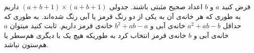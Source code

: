 فرض کنید $a$ و $b$ اعداد صحیح  مثبتی باشند. جدولی  $(a + b + 1) \times (a + b + 1)$ داریم به طوری که هر خانه‌ی آن به یکی از دو رنگ قرمز یا آبی رنگ شده‌اند. به طوری که حداقل $a^2 + ab - b$ خانه‌ی آبی و $b^2 + ab - a$ خانه‌ی قرمز داریم. ثابت کنید میتوان $a$ خانه‌ی آبی و $b$ خانه‌ی قرمز انتخاب کرد به طوریکه هیچ یک با دیگری هم‌سطر یا هم‌ستون نباشد.